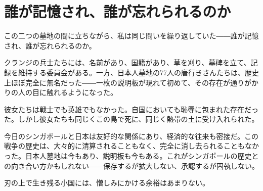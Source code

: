 \section{誰が記憶され、誰が忘れられるのか}

この二つの墓地の間に立ちながら、私は同じ問いを繰り返していた――誰が記憶され、誰が忘れられるのか。

クランジの兵士たちには、名前があり、国籍があり、草を刈り、墓碑を立て、記録を維持する委員会がある。一方、日本人墓地の77人の唐行きさんたちは、歴史上ほぼ完全に無名だった――一枚の説明板が現れて初めて、その存在が通りがかりの人の目に触れるようになった。

彼女たちは戦士でも英雄でもなかった。自国においても恥辱に包まれた存在だった。しかし彼女たちも同じくこの島で死に、同じく熱帯の土に受け入れられた。

今日のシンガポールと日本は友好的な関係にあり、経済的な往来も密接だ。この戦争の歴史は、大々的に清算されることもなく、完全に消し去られることもなかった。日本人墓地は今もあり、説明板も今もある。これがシンガポールの歴史との向き合い方かもしれない――保存するが拡大しない、承認するが固執しない。

刃の上で生き残る小国には、憎しみにかける余裕はあまりない。
